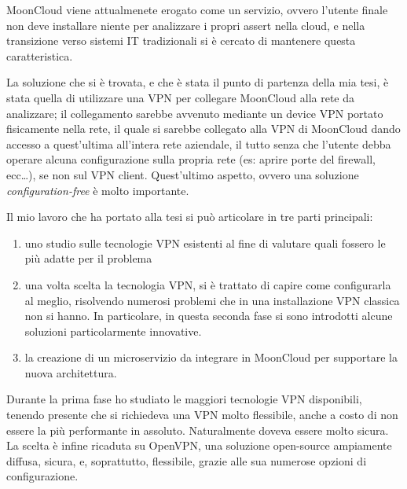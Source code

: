 \documentclass[10pt,a4paper]{article}
\begin{document}
        MoonCloud viene attualmenete erogato come un servizio, ovvero l'utente finale
        non deve installare niente per analizzare i propri assert nella cloud, e nella transizione
        verso sistemi IT tradizionali si è cercato di mantenere questa caratteristica.


        La soluzione che si è trovata, e che è stata il punto di partenza della mia tesi,
        è stata quella di utilizzare una VPN per collegare MoonCloud alla rete
        da analizzare; il collegamento sarebbe avvenuto mediante un device VPN portato
        fisicamente nella rete, il quale si sarebbe collegato alla VPN di MoonCloud dando
        accesso a quest'ultima all'intera rete aziendale, il tutto senza che
        l'utente debba operare alcuna configurazione sulla propria rete (es: aprire porte
        del firewall, ecc\ldots), se non sul VPN client. Quest'ultimo aspetto, ovvero
        una soluzione \textit{configuration-free} è molto importante.

        Il mio lavoro che ha portato alla tesi si può articolare in tre parti principali:
        \begin{enumerate}
            \item uno studio sulle tecnologie VPN esistenti al fine di valutare quali
            fossero le più adatte per il problema
            \item una volta scelta la tecnologia VPN, si è trattato di capire come
            configurarla al meglio, risolvendo numerosi problemi che in una
            installazione VPN classica non si hanno. In particolare, in questa seconda
            fase si sono introdotti alcune soluzioni particolarmente innovative.
            \item la creazione di un microservizio da integrare in MoonCloud per
            supportare la nuova architettura.
        \end{enumerate}

        
        Durante la prima fase ho studiato le maggiori tecnologie VPN disponibili,
        tenendo presente che si richiedeva una VPN molto flessibile, anche a costo
        di non essere la più performante in assoluto. Naturalmente doveva essere
        molto sicura. La scelta è infine ricaduta su OpenVPN, una soluzione open-source
        ampiamente diffusa, sicura, e, soprattutto, flessibile, grazie alle sua numerose
        opzioni di configurazione.
\end{document}
